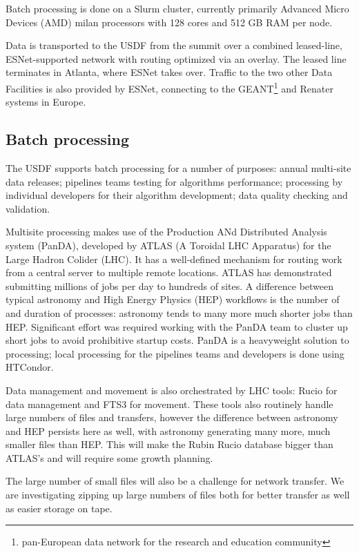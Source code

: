 Batch processing is done on a Slurm cluster, currently primarily Advanced Micro Devices (AMD) milan
processors with 128 cores and 512 GB RAM per node.

Data is transported to the USDF from the summit over a combined
leased-line, ESNet-supported network with routing optimized via an
overlay. The leased line terminates in Atlanta, where ESNet takes
over. Traffic to the two other Data Facilities is also provided by
ESNet, connecting to the GEANT\footnote{pan-European data network for the research and education community}
 and Renater systems in Europe.

\subsection{Batch processing}

The USDF supports batch processing for a number of purposes: annual
multi-site data releases; pipelines teams testing for algorithms
performance; processing by individual developers for their algorithm
development; data quality checking and validation.

Multisite processing makes use of the Production ANd Distributed Analysis system (PanDA),\cite{2024CSBS....8....4M} developed
by ATLAS (A Toroidal LHC Apparatus) for the Large Hadron Colider (LHC).
It has a well-defined mechanism for routing work
from a central server to multiple remote locations. ATLAS has
demonstrated submitting millions of jobs per day to hundreds of sites.
A difference between typical astronomy and High Energy Physics (HEP) workflows is the
number of and duration of processes: astronomy tends to many more much
shorter jobs than HEP.\cite{2023arXiv231204921K} Significant effort was required working with the PanDA
team to cluster up short jobs to avoid prohibitive startup costs.
PanDA is a heavyweight solution to processing; local processing for
the pipelines teams and developers is done using HTCondor.

Data management and movement is also orchestrated by LHC tools: Rucio
for data management and FTS3 for movement. These tools also routinely
handle large numbers of files and transfers, however the difference between astronomy
and HEP persists here as well, with astronomy generating many more,
much smaller files than HEP. This will make the Rubin Rucio database
bigger than ATLAS's and will require some growth planning.

The large number of small files will also be a challenge for network
transfer. We are investigating zipping up large numbers of files both
for better transfer as well as easier storage on tape.

